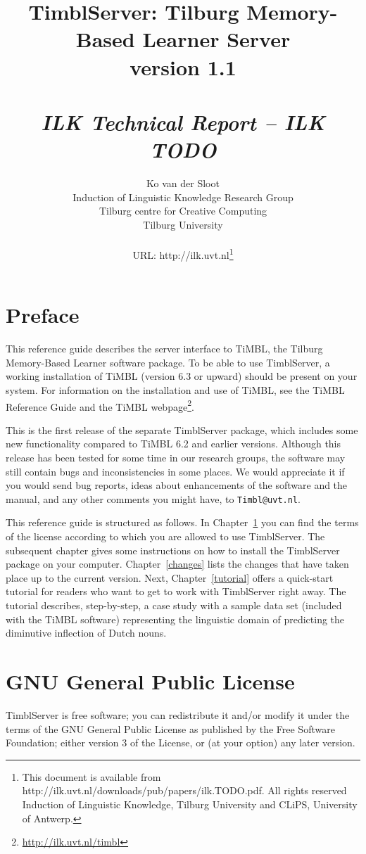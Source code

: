\documentclass{report}
\author{Ko van der Sloot \\
	Induction of Linguistic Knowledge Research Group\\
	Tilburg centre for Creative Computing\\
        Tilburg University \\ \\
       URL: http://ilk.uvt.nl\thanks{This document is available from
	http://ilk.uvt.nl/downloads/pub/papers/ilk.TODO.pdf. All rights reserved
	Induction of Linguistic Knowledge, Tilburg University and 
        CLiPS, University of Antwerp.}}
\title{{\huge TimblServer: Tilburg Memory-Based Learner Server} \\ \vspace*{0.5cm}
{\bf version 1.1} \\ \vspace*{0.5cm}{\huge Manual}\\
\vspace*{1cm} {\it ILK Technical Report -- ILK TODO}}
\begin{document}

\maketitle

\tableofcontents

\chapter*{Preface}

This reference guide describes the server interface to TiMBL, the
Tilburg Memory-Based Learner software package. To be able to use
TimblServer, a working installation of TiMBL (version 6.3 or upward)
should be present on your system. For information on the installation
and use of TiMBL, see the TiMBL Reference Guide \cite{Daelemans+10}
and the TiMBL webpage\footnote{\url{http://ilk.uvt.nl/timbl}}.

This is the first release of the separate TimblServer package, which
includes some new functionality compared to TiMBL 6.2 and earlier
versions.  Although this release has been tested for some time in our
research groups, the software may still contain bugs and
inconsistencies in some places. We would appreciate it if you would
send bug reports, ideas about enhancements of the software and the
manual, and any other comments you might have, to {\tt Timbl@uvt.nl}.

This reference guide is structured as follows. In
Chapter~\ref{license} you can find the terms of the license according
to which you are allowed to use TimblServer. The subsequent chapter gives
some instructions on how to install the TimblServer package on your
computer. Chapter~\ref{changes} lists the changes that have taken
place up to the current version. Next, Chapter~\ref{tutorial} offers a
quick-start tutorial for readers who want to get to work with TimblServer
right away. The tutorial describes, step-by-step, a case study with a
sample data set (included with the TiMBL software) representing the
linguistic domain of predicting the diminutive inflection of Dutch
nouns. 

\chapter{GNU General Public License}
\label{license}

TimblServer is free software; you can redistribute it and/or modify it under the terms of the GNU General Public License as published by the Free Software Foundation; either version 3 of the License, or (at your option) any later version.
\end{document}
